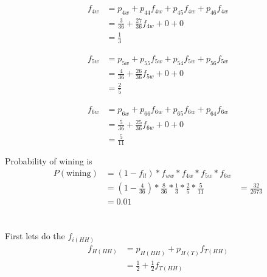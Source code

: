 \documentclass[12pt, a4paper]{article}
\begin{document}
\section{}
\begin{subequations}
  \begin{align}
    f_{4w} &= p_{4w} + p_{44}f_{4w} + p_{45}f_{4w} + p_{46}f_{4w}\\
           &= \frac{3}{36} + \frac{27}{36}f_{4w} + 0 + 0 \\
           &= \frac{1}{3}
  \end{align}
\end{subequations}


\begin{subequations}
  \begin{align}
    f_{5w} &= p_{5w} + p_{55}f_{5w} + p_{54}f_{5w} + p_{56}f_{5w}\\
           &= \frac{4}{36} + \frac{26}{36}f_{5w} + 0 + 0 \\
           &= \frac{2}{5}
  \end{align}
\end{subequations}

\begin{subequations}
  \begin{align}
    f_{6w} &= p_{6w} + p_{66}f_{6w} + p_{65}f_{6w} + p_{64}f_{6w}\\
           &= \frac{5}{36} + \frac{25}{36}f_{6w} + 0 + 0 \\
           &= \frac{5}{11}
  \end{align}
\end{subequations}

Probability of wining is
\begin{subequations}
  \begin{align}
    P(\text{wining}) &= (1-f_{ll}) * f_{ww} * f_{4w} * f_{5w} * f_{6w}\\
                     &= (1-\frac{4}{36}) * \frac{8}{36} * \frac{1}{3} * \frac{2}{5} * \frac{5}{11}
                     &= \frac{32}{2673}\\
                     &= 0.01
  \end{align}
\end{subequations}

\section{}
\subsection{}
First lets do the $f_{i(HH)}$
\begin{subequations}
  \begin{align}
    f_{H(HH)} &= p_{H(HH)} + p_{H(T)} f_{T(HH)}\\
              &= \frac{1}{2} + \frac{1}{2} f_{T(HH)}\label{eq:1}
  \end{align}
\end{subequations}
\end{document}
